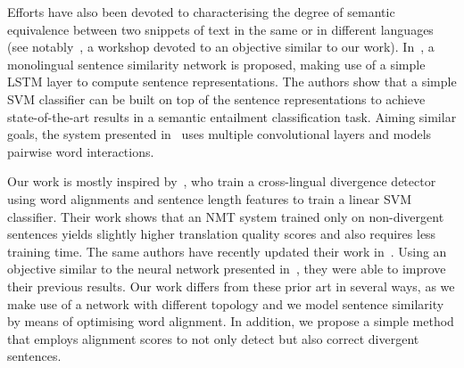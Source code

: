 \documentclass[11pt,a4paper]{article}
\begin{document}
Efforts have also been devoted to characterising the degree of
semantic equivalence between two snippets of text in the same or in
different languages (see notably~\cite{conf/semeval/AgirreBCDGMRW16}, a workshop devoted to an objective similar to our work). In~\cite{Mueller:2016:SRA:3016100.3016291}, a monolingual sentence similarity network is proposed, making use of a simple LSTM layer to compute sentence representations. The authors show that a simple SVM classifier can be built on top of the sentence representations to achieve state-of-the-art results in a semantic entailment classification task. Aiming similar goals, the system presented in~\cite{N16-1108} uses multiple convolutional layers and models pairwise word interactions. %

Our work is mostly inspired by~\citet{W17-3209}, who train a
cross-lingual divergence detector using word alignments and sentence
length features to train a linear SVM classifier. Their work shows
that an NMT system trained only on non-divergent sentences yields
slightly higher translation quality scores and also requires less
training time. The same authors have recently updated their work
in~\cite{DBLP:journals/corr/abs-1803-11112}. Using an objective
similar to the neural network presented in~\cite{N16-1108}, they were
able to improve their previous results. Our work differs from these
prior art in several ways, as we make use of a network with different
topology and we model sentence similarity by means of optimising word
alignment. In addition, we propose a simple method that employs
alignment scores to not only detect but also correct divergent sentences.



\end{document}
